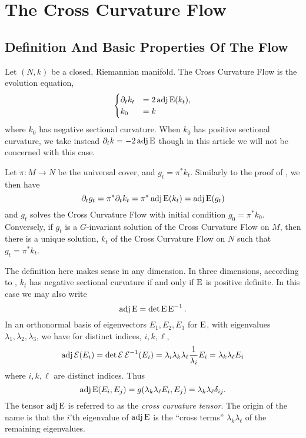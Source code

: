 \documentclass[a4paper, 12pt]{amsart}
\begin{document}
\section{The Cross Curvature Flow}
\label{sec:xcf}

\subsection{Definition And Basic Properties Of  The Flow}
\label{subsec:xcf_defn}

Let \((N, k)\) be a closed, Riemannian manifold. The Cross Curvature Flow is the evolution equation,
\begin{equation}
\label{eq:xcf}
\begin{cases}
\partial_t k_t  &= 2 \operatorname{adj}\operatorname{E}(k_t), \\
k_0 &= k
\end{cases}
\end{equation}
where \(k_0\) has negative sectional curvature. When \(k_0\) has positive sectional curvature, we take instead \(\partial_t k = -2\operatorname{adj}\operatorname{E}\) though in this article we will not be concerned with this case.

\begin{rem}
Let \(\pi : M \to N\) be the universal cover, and \(g_t = \pi^{\ast} k_t\). Similarly to the proof of , we then have
\[
\partial_t g_t = \pi^{\ast} \partial_t k_t = \pi^{\ast} \operatorname{adj}\operatorname{E}(k_t) = \operatorname{adj}\operatorname{E}(g_t)
\]
and \(g_t\) solves the Cross Curvature Flow with initial condition \(g_0 = \pi^{\ast} k_0\). Conversely, if \(g_t\) is a \(G\)-invariant solution of the Cross Curvature Flow on \(M\), then there is a unique solution, \(k_t\) of the Cross Curvature Flow on \(N\) such that \(g_t = \pi^{\ast} k_t\).
\end{rem}

The definition here makes sense in any dimension. In three dimensions, according to , \(k_t\) has negative sectional curvature if and only if \(\operatorname{E}\) is positive definite. In this case we may also write
\[
\operatorname{adj}\operatorname{E} = \det \operatorname{E} \operatorname{E}^{-1}.
\]
In an orthonormal basis of eigenvectors \(E_1, E_2, E_3\) for \(\operatorname{E}\), with eigenvalues \(\lambda_1, \lambda_2, \lambda_3\), we have for distinct indices, \(i, k, \ell\),
\[
\operatorname{adj}\operatorname{\mathcal{E}} (E_i) = \det\operatorname{\mathcal{E}} \operatorname{\mathcal{E}}^{-1}(E_i) = \lambda_i \lambda_k \lambda_{\ell} \frac{1}{\lambda_i} E_i = \lambda_k \lambda_{\ell} E_i
\]
where \(i,k,\ell\) are distinct indices. Thus
\[
\operatorname{adj}\operatorname{E}(E_i, E_j) = g(\lambda_k \lambda_{\ell} E_i, E_j) = \lambda_k \lambda_{\ell} \delta_{ij}.
\]
The tensor \(\operatorname{adj}\operatorname{E}\) is referred to as the \emph{cross curvature tensor}. The origin of the name is that the \(i\)'th eigenvalue of \(\operatorname{adj}\operatorname{E}\) is the ``cross terms'' \(\lambda_k \lambda_{\ell}\) of the remaining eigenvalues.
\end{document}

